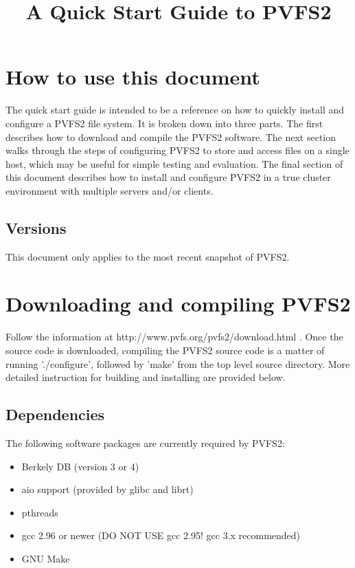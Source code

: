 \documentclass[11pt, letterpaper]{article}
\title{A Quick Start Guide to PVFS2}
\begin{document}
\maketitle

\tableofcontents

\newpage

\thispagestyle{empty}

\section{How to use this document}
\label{sec:howto}

The quick start guide is intended to be a reference on how to quickly
install and configure a PVFS2 file system.  It is broken down into
three parts.  The first describes how to download and compile the
PVFS2 software.  The next section walks through the steps of
configuring PVFS2 to store and access files on a single host, which
may be useful for simple testing and evaluation.  The final section of
this document describes how to install and configure PVFS2 in a true
cluster environment with multiple servers and/or clients.

\subsection{Versions}

This document only applies to the most recent snapshot of PVFS2.

\section{Downloading and compiling PVFS2}

Follow the information at http://www.pvfs.org/pvfs2/download.html .
Once the source code is downloaded,
compiling the PVFS2 source code is a matter of running './configure',
followed by 'make' from the top level source directory.  More detailed
instruction for building and installing are provided below.

\subsection{Dependencies}

The following software packages are currently required by PVFS2:
\begin{itemize}
\item Berkely DB (version 3 or 4)
\item aio support (provided by glibc and librt)
\item pthreads
\item gcc 2.96 or newer (DO NOT USE gcc 2.95! gcc 3.x recommended)
\item GNU Make
\end{itemize}
\end{document}
